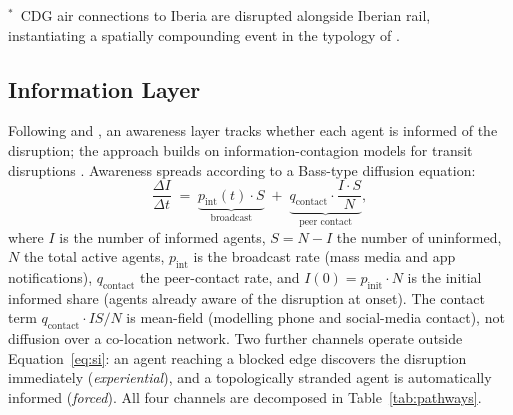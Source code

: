 \documentclass[12pt,a4paper]{article}
\begin{document}
\begin{table}[h]
\centering
\caption{Disruption scenario specifications.}
\label{tab:scenarios}
\small
{}
\par\smallskip
{\footnotesize $^{\ast}$~CDG air connections to Iberia are disrupted alongside Iberian rail,
instantiating a spatially compounding event in the typology of \citet{Zscheischler2020}.}
\end{table}

\subsection{Information Layer}

Following \citet{Leng2020} and \citet{Cats2014}, an awareness layer tracks
whether each agent is informed of the disruption;
the approach builds on information-contagion models for transit disruptions
\citep{HuaOng2018}. Awareness spreads according to a Bass-type diffusion equation:
\begin{equation}
  \frac{\Delta I}{\Delta t} \;=\;
  \underbrace{p_{\text{int}}(t) \cdot S}_{\text{broadcast}} \;+\;
  \underbrace{q_{\text{contact}} \cdot \frac{I \cdot S}{N}}_{\text{peer contact}},
  \label{eq:si}
\end{equation}
where $I$ is the number of informed agents, $S = N - I$ the number of uninformed,
$N$ the total active agents, $p_{\text{int}}$ is the broadcast rate (mass media and app notifications),
$q_{\text{contact}}$ the peer-contact rate, and $I(0) = p_{\text{init}} \cdot N$ is the initial
informed share (agents already aware of the disruption at onset).
The contact term $q_{\text{contact}} \cdot IS/N$ is mean-field (modelling phone and social-media contact), not diffusion over a co-location network.
Two further channels operate outside Equation~\ref{eq:si}: an agent reaching a blocked edge discovers the disruption immediately (\emph{experiential}), and a topologically stranded agent is automatically informed (\emph{forced}).
All four channels are decomposed in Table~\ref{tab:pathways}.
\end{document}
